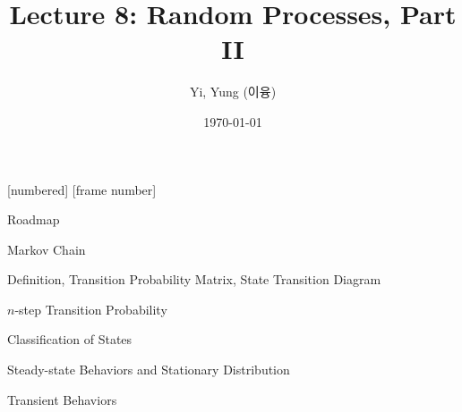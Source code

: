 

\csname\pdfmode\endcsname

{
  [numbered]
  [frame number]  %
} 





\title[]{Lecture 8: Random Processes, Part II}
\author{Yi, Yung (이융)}
\date{\today}









\begin{frame}
  \titlepage
\end{frame}




\begin{frame}{Roadmap}

{\Large Markov Chain}


  \plitemsep 0.1in

\bce[(1)]



\item Definition, Transition Probability Matrix, State Transition Diagram

\item $n$-step Transition Probability

\item Classification of States

\item Steady-state Behaviors and Stationary Distribution

\item Transient Behaviors



\ece 

\end{frame}

